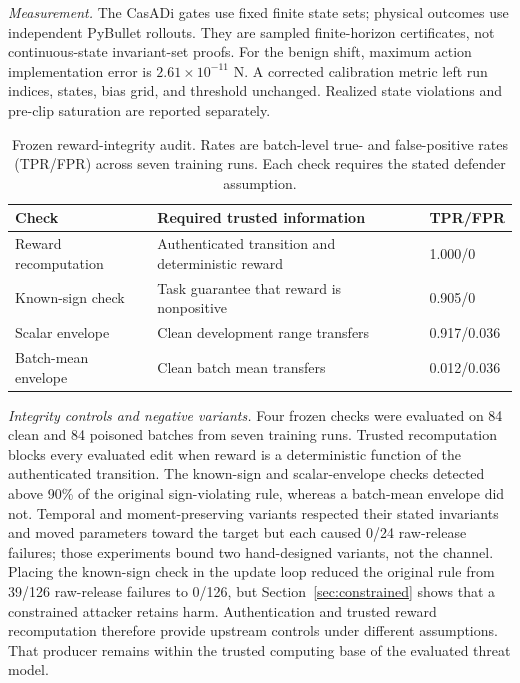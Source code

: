 \emph{Measurement.}  The CasADi gates use fixed finite state sets; physical outcomes use independent
PyBullet rollouts.  They are sampled finite-horizon certificates, not
continuous-state invariant-set proofs.  For the benign shift, maximum action
implementation error is $2.61\times10^{-11}$ N.  A corrected calibration
metric left run indices, states, bias grid, and threshold unchanged.  Realized
state violations and pre-clip saturation are reported separately.

\begin{table}[t]
\centering
\caption{Frozen reward-integrity audit.  Rates are batch-level true- and
false-positive rates (TPR/FPR) across seven training runs.  Each check requires
the stated defender assumption.}
\label{tab:reward-integrity}
\footnotesize
\begin{tabular}{@{}L{0.27\columnwidth}L{0.43\columnwidth}L{0.17\columnwidth}@{}}
\toprule
Check & Required trusted information & TPR/FPR\\
\midrule
Reward recomputation & Authenticated transition and deterministic reward
& 1.000/0\\
Known-sign check & Task guarantee that reward is nonpositive & 0.905/0\\
Scalar envelope & Clean development range transfers & 0.917/0.036\\
Batch-mean envelope & Clean batch mean transfers & 0.012/0.036\\
\bottomrule
\end{tabular}
\end{table}

\emph{Integrity controls and negative variants.}  Four frozen checks were
evaluated on 84 clean and 84 poisoned batches from seven training runs.
Trusted recomputation blocks every evaluated edit when reward is a
deterministic function of the authenticated transition.  The known-sign and
scalar-envelope checks detected above 90\% of the original sign-violating rule,
whereas a batch-mean envelope did not.  Temporal and moment-preserving variants
respected their stated invariants and moved parameters toward the target but
each caused 0/24 raw-release failures; those experiments bound two hand-designed
variants, not the channel.  Placing the known-sign check in the update loop
reduced the original rule from 39/126 raw-release failures to 0/126, but
Section~\ref{sec:constrained} shows that a constrained attacker retains harm.
Authentication and trusted reward recomputation therefore provide upstream
controls under different assumptions.  That producer remains within the
trusted computing base of the evaluated threat model.

